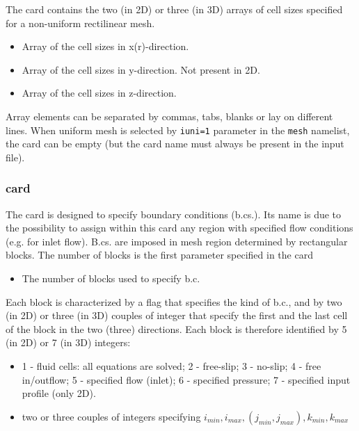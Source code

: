 The  card contains the two (in 2D) or three (in 3D) arrays of cell 
sizes specified for a non-uniform rectilinear mesh. 

\begin{itemize}
\item
{}
{Array of the cell sizes in x(r)-direction.}

\item
{}
{Array of the cell sizes in y-direction.
Not present in 2D.}

\item
{}
{Array of the cell sizes in z-direction.}
\end{itemize}

Array elements can be separated by commas, tabs, blanks or lay on different
lines.  When uniform mesh is selected by {\tt iuni=1} parameter in the 
{\tt mesh} namelist, the card can be empty (but the card 
name must always be present in the input file).

\subsubsection{ card}

The  card is designed to specify boundary conditions (b.cs.).
Its name is due to the possibility to assign within this card any region with
specified flow conditions (e.g. for inlet flow). B.cs. are imposed in 
mesh region determined by rectangular blocks. The number of blocks is the
first parameter specified in the card

\begin{itemize}
\item
{}
{The number of blocks used to specify b.c.}
\end{itemize}

Each block is characterized
by a flag that specifies the kind of b.c., and by two (in 2D) or three (in 3D)
couples of integer that specify the first and the last cell of the block in 
the two (three) directions. Each block is therefore identified by 5 (in 2D)
or 7 (in 3D) integers:\\

\begin{itemize}
\item
{}
{1 - fluid cells: all equations are solved; 2 - free-slip;
 3 - no-slip; 4 - free in/outflow; 5 - specified flow (inlet); 
 6 - specified pressure; 7 - specified input profile (only 2D).}

\item
{}
{two or three couples of integers specifying 
$ i_{min}, i_{max}, (j_{min}, j_{max}), k_{min}, k_{max}$ }

\end{itemize}

